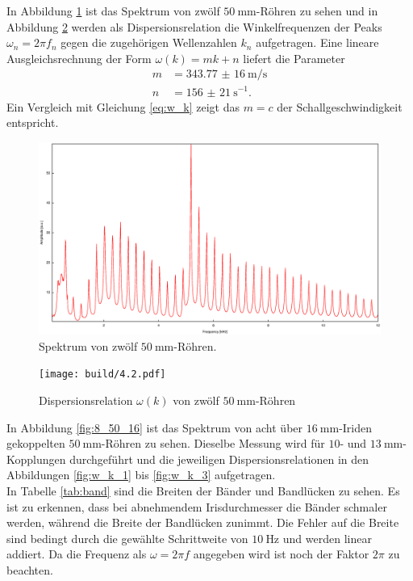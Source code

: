 \newpage
\noindent In Abbildung \ref{fig:12_50} ist das Spektrum von zwölf $\SI{50}{\milli\meter}$-Röhren zu sehen und in Abbildung \ref{fig:w_k} werden als Dispersionsrelation die Winkelfrequenzen der Peaks $\omega_n=2\pi f_n$ gegen die zugehörigen Wellenzahlen $k_n$ aufgetragen. Eine lineare Ausgleichsrechnung der Form $\omega(k)=m k + n$ liefert die Parameter
\begin{align*}
m&=\SI{343,77(16)}{\meter\per\second}\\
n&=\SI{156(21)}{\second^{-1}}\text{.}
\end{align*}
Ein Vergleich mit Gleichung \eqref{eq:w_k} zeigt das $m=c$ der Schallgeschwindigkeit entspricht.\\

\begin{figure}
\centering
\includegraphics[width=\linewidth-60pt,height=\textheight-60pt,keepaspectratio]{FP-V23data/4.2_600mm.eps}
\caption{Spektrum von zwölf $\SI{50}{\milli\meter}$-Röhren.}
\label{fig:12_50}
\end{figure}

\begin{figure}
\centering
\texttt{[image: build/4.2.pdf]}
\caption{Dispersionsrelation $\omega(k)$ von zwölf $\SI{50}{\milli\meter}$-Röhren}
\label{fig:w_k}
\end{figure}

\newpage
\noindent In Abbildung \ref{fig:8_50_16} ist das Spektrum von acht über $\SI{16}{\milli\meter}$-Iriden gekoppelten $\SI{50}{\milli\meter}$-Röhren zu sehen. Dieselbe Messung wird für $10$- und $\SI{13}{\milli\meter}$-Kopplungen durchgeführt und die jeweiligen Dispersionsrelationen in den Abbildungen \ref{fig:w_k_1} bis \ref{fig:w_k_3} aufgetragen.\\
In Tabelle \ref{tab:band} sind die Breiten der Bänder und Bandlücken zu sehen. Es ist zu erkennen, dass bei abnehmendem Irisdurchmesser die Bänder schmaler werden, während die Breite der Bandlücken zunimmt. Die Fehler auf die Breite sind bedingt durch die gewählte Schrittweite von $\SI{10}{\hertz}$ und werden linear addiert. Da die Frequenz als $\omega = 2\pi f$ angegeben wird ist noch der Faktor $2\pi$ zu beachten.\\

